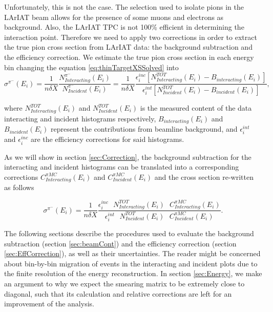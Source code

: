 Unfortunately, this is not the case. The selection used to isolate pions in the LArIAT beam allows for the presence of some muons and electrons as background. Also, the LArIAT TPC is not 100\% efficient in determining the interaction point. Therefore we need to apply two corrections in order to extract the true pion cross section from LArIAT data: the background subtraction and the efficiency correction. 
We estimate the true pion cross section in each energy bin changing  the equation \ref{eq:thinTargetXSSolved} into
\begin{equation}
 \sigma^{\pi^-}(E_{i})  =\frac{1}{n \delta X}\frac{N^{\pi^-}_{Interacting} (E_{i})}{N^{\pi^-}_{Incident}(E_{i})} = \frac{1}{n \delta X}\frac{ \epsilon^{inc}_i [ N^{TOT}_{Interacting} (E_{i}) - B_{interacting} (E_i)] }{   \epsilon^{int}_i [N^{TOT}_{Incident}(E_{i}) - B_{incident} (E_i)]},
\label{eq:True}
\end{equation}



 
where  $N^{TOT}_{Interacting} (E_{i})$ and $N^{TOT}_{Incident}(E_{i})$ is the measured content of the data interacting and incident histograms respectively, $B_{interacting} (E_i)$ and $B_{incident} (E_i)$ represent the contributions from beamline background, and  $\epsilon^{int}_i$ and  $\epsilon^{inc}_i$ are the efficiency corrections for said histograms. 

As we will show in section \ref{sec:Correction}, the background subtraction for the interacting and incident histograms can be translated into a corresponding corrections $C^{\pi MC}_{Interacting} (E_{i})$ and $C^{\pi MC}_{Incident} (E_{i})$ and the cross section re-written as follows

\begin{equation}
   \sigma^{\pi^-}(E_{i})  = \frac{1}{n \delta X}\frac{ \epsilon^{inc}_i  \text{  } N^{TOT}_{Interacting} (E_{i}) \text{  } C^{\pi MC}_{Interacting} (E_{i}) }{   \epsilon^{int}_i \text{  }N^{TOT}_{Incident}(E_{i})\text{  } C^{\pi MC}_{Incident} (E_{i})}.
\label{eq:C}
\end{equation}




The following sections describe the procedures used to evaluate  the background subtraction (section \ref{sec:beamCont}) and the efficiency correction (section \ref{sec:EffCorrection}), as well as  their uncertainties. 
The reader might be concerned about bin-by-bin migration of events in the interacting and incident plots due to the finite resolution of the energy reconstruction. In section \ref{sec:Energy}, we make an argument to why we expect the smearing matrix to be extremely close to diagonal, such that its calculation and relative corrections are left for an improvement of the analysis.



